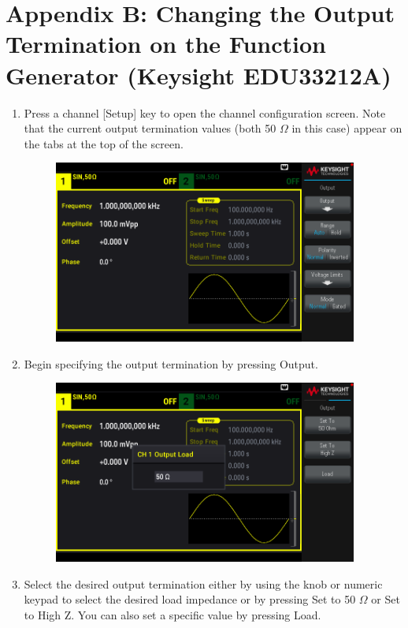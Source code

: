 \documentclass[10pt]{PhysLab1C} %
\begin{document}

\section*{Appendix B: Changing the Output Termination on the Function Generator (Keysight EDU33212A)}


\begin{enumerate}
\def\labelenumi{\arabic{enumi}.}
\item
  Press a channel {[}Setup{]} key to open the channel configuration
  screen. Note that the current output termination values (both 50 $\Omega$ in
  this case) appear on the tabs at the top of the screen.

  \begin{figure}[H]
  \centering
  \includegraphics[width=10cm]{lab1fig/EDU33212A-term1.png}
  \caption{}
  \end{figure}
  
\item
  Begin specifying the output termination by pressing Output.

  \begin{figure}[H]
  \centering
  \includegraphics[width=10cm]{lab1fig/EDU33212A-term2.png}
  \caption{}
  \end{figure}
\item
  Select the desired output termination either by using the knob or
  numeric keypad to select the desired load impedance or by pressing Set
  to 50 $\Omega$ or Set to High Z. You can also set a specific value by
  pressing Load.


\end{enumerate}
\end{document}

